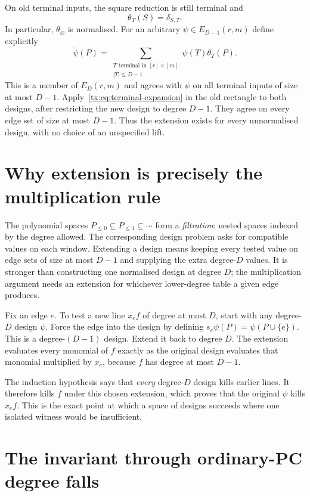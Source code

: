 On old terminal inputs, the square reduction is still terminal and
\[
 \theta_T(S)=\delta_{S,T}.
\]
In particular, $\theta_{\varnothing}$ is normalised.  For an arbitrary
$\psi\in E_{D-1}(r,m)$ define explicitly
\[
 \widetilde\psi(P)=
    \sum_{\substack{T\text{ terminal in }[r]\times[m]\\|T|\leq D-1}}
                     \psi(T)\theta_T(P).
\]
This is a member of $E_D(r,m)$ and agrees with $\psi$ on all terminal
inputs of size at most $D-1$.  Apply~\eqref{tx:eq:terminal-expansion} in the
old rectangle to both designs, after restricting the new design to
degree $D-1$.  They agree on every edge set of size at most $D-1$.
Thus the extension exists for every unnormalised design, with no
choice of an unspecified lift.

\section{Why extension is precisely the multiplication rule}
The polynomial spaces $P_{\le0}\subseteq P_{\le1}\subseteq\cdots$
form a \emph{filtration}: nested spaces indexed by the degree allowed.
The corresponding design problem asks for compatible values on each
window. Extending a design means keeping every tested value on edge
sets of size at most $D-1$ and supplying the extra degree-$D$ values.
It is stronger than constructing one normalised design at degree $D$;
the multiplication argument needs an extension for whichever
lower-degree table a given edge produces.

Fix an edge $e$. To test a new line $x_e f$ of degree at most $D$,
start with any degree-$D$ design $\psi$. Force the edge into the design
by defining $s_e\psi(P)=\psi(P\cup\{e\})$. This is a degree-$(D-1)$
design. Extend it back to degree $D$. The extension evaluates every
monomial of $f$ exactly as the original design evaluates that monomial
multiplied by $x_e$, because $f$ has degree at most $D-1$.

The induction hypothesis says that \emph{every} degree-$D$ design kills
earlier lines. It therefore kills $f$ under this chosen extension,
which proves that the original $\psi$ kills $x_e f$. This is the exact
point at which a space of designs succeeds where one isolated witness
would be insufficient.

\section{The invariant through ordinary-PC degree falls}

